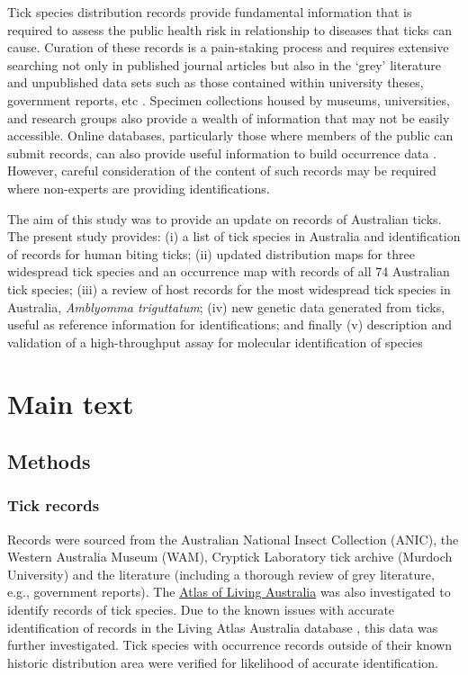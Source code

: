 \documentclass[a4paper, nobind]{templates/ociamthesis}
\begin{document}
Tick species distribution records provide fundamental information that is required to assess the public health risk in relationship to diseases that ticks can cause.
Curation of these records is a pain-staking process and requires extensive searching not only in published journal articles but also in the `grey' literature and unpublished data sets such as those contained within university theses, government reports, etc \autocite{estrada-penaSpeciesOccurrenceTicks2019}.
Specimen collections housed by museums, universities, and research groups also provide a wealth of information that may not be easily accessible.
Online databases, particularly those where members of the public can submit records, can also provide useful information to build occurrence data \autocite{belbinAtlasLivingAustralia2021}.
However, careful consideration of the content of such records may be required where non-experts are providing identifications.

The aim of this study was to provide an update on records of Australian ticks.
The present study provides: (i) a list of tick species in Australia and identification of records for human biting ticks; (ii) updated distribution maps for three widespread tick species and an occurrence map with records of all 74 Australian tick species; (iii) a review of host records for the most widespread tick species in Australia, \emph{Amblyomma triguttatum}; (iv) new genetic data generated from ticks, useful as reference information for identifications; and finally (v) description and validation of a high-throughput assay for molecular identification of species

\hypertarget{main-text}{%
\section{Main text}\label{main-text}}

\hypertarget{methods}{%
\subsection{Methods}\label{methods}}

\hypertarget{tick-records}{%
\subsubsection{Tick records}\label{tick-records}}

Records were sourced from the Australian National Insect Collection (ANIC), the Western Australia Museum (WAM), Cryptick Laboratory tick archive (Murdoch University) and the literature (including a thorough review of grey literature, e.g., government reports).
The \href{https://www.ala.org.au/}{Atlas of Living Australia} was also investigated to identify records of tick species.
Due to the known issues with accurate identification of records in the Living Atlas Australia database \autocite{belbinAtlasLivingAustralia2021}, this data was further investigated.
Tick species with occurrence records outside of their known historic distribution area were verified for likelihood of accurate identification.
\end{document}

